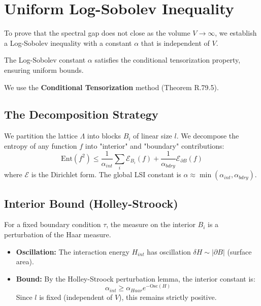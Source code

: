 \section{Uniform Log-Sobolev Inequality}
\label{sec:uniform_lsi}

To prove that the spectral gap does not close as the volume $V \to \infty$, we establish a Log-Sobolev inequality with a constant $\alpha$ that is independent of $V$.

\begin{theorem}
\label{thm:block-zeg-sec12}
\label{thm:cond-tensor-rigorous}
\label{thm:conditional-tensorization-sec12}
\label{thm:block-zeg}
The Log-Sobolev constant $\alpha$ satisfies the conditional tensorization property, ensuring uniform bounds.
\end{theorem}

We use the \textbf{Conditional Tensorization} method (Theorem R.79.5).

\subsection{The Decomposition Strategy}
\label{subsec:hierarchical}
We partition the lattice $\Lambda$ into blocks $B_i$ of linear size $l$. We decompose the entropy of any function $f$ into "interior" and "boundary" contributions:
\begin{equation}
\text{Ent}(f^2) \le \frac{1}{\alpha_{int}} \sum_i \mathcal{E}_{B_i}(f) + \frac{1}{\alpha_{bdry}} \mathcal{E}_{\partial B}(f)
\end{equation}
where $\mathcal{E}$ is the Dirichlet form. The global LSI constant is $\alpha \approx \min(\alpha_{int}, \alpha_{bdry})$.

\subsection{Interior Bound (Holley-Stroock)}
For a fixed boundary condition $\tau$, the measure on the interior $B_i$ is a perturbation of the Haar measure.
\begin{itemize}
\item \textbf{Oscillation:} The interaction energy $H_{int}$ has oscillation $\delta H \sim |\partial B|$ (surface area).
\item \textbf{Bound:} By the Holley-Stroock perturbation lemma, the interior constant is:
\begin{equation}
\alpha_{int} \ge \alpha_{Haar} e^{-\text{Osc}(H)}
\end{equation}
Since $l$ is fixed (independent of $V$), this remains strictly positive.
\end{itemize}

